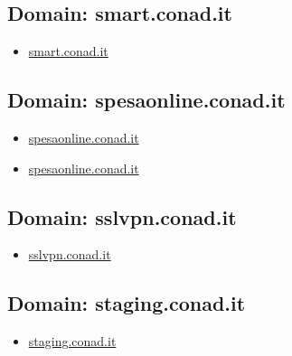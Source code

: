 \documentclass{article}
\begin{document}
    \subsection{Domain: smart.conad.it}
    \begin{itemize}
        
            
            \item \href{ http://smart.conad.it}{ smart.conad.it }
            
        
    \end{itemize}

    \subsection{Domain: spesaonline.conad.it}
    \begin{itemize}
        
            
            \item \href{ https://spesaonline.conad.it/order?bEcommerce=sap\&orderId=o-s-N-23-03667190}{ spesaonline.conad.it }
            
            \item \href{ https://spesaonline.conad.it/}{ spesaonline.conad.it }
            
        
    \end{itemize}

    \subsection{Domain: sslvpn.conad.it}
    \begin{itemize}
        
            
            \item \href{ http://sslvpn.conad.it}{ sslvpn.conad.it }
            
        
    \end{itemize}

    \subsection{Domain: staging.conad.it}
    \begin{itemize}
        
            
            \item \href{ http://staging.conad.it/}{ staging.conad.it }
            
        
    \end{itemize}
\end{document}
